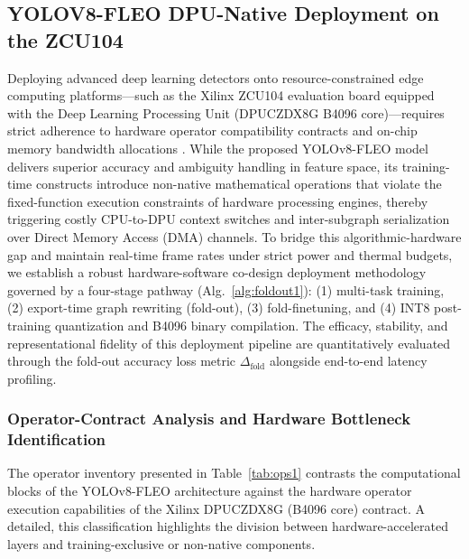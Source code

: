 \documentclass[algorithms,article,submit,moreauthors]{Definitions/mdpi}
\begin{document}
\subsection{YOLOV8-FLEO DPU-Native Deployment on the ZCU104}
\label{sec:hard}
Deploying advanced deep learning detectors onto resource-constrained edge computing platforms---such as the Xilinx ZCU104 evaluation board equipped with the Deep Learning Processing Unit (DPUCZDX8G B4096 core)---requires strict adherence to hardware operator compatibility contracts and on-chip memory bandwidth allocations \citep{bib25}. While the proposed YOLOv8-FLEO model delivers superior accuracy and ambiguity handling in feature space, its training-time constructs introduce non-native mathematical operations that violate the fixed-function execution constraints of hardware processing engines, thereby triggering costly CPU-to-DPU context switches and inter-subgraph serialization over Direct Memory Access (DMA) channels. To bridge this algorithmic-hardware gap and maintain real-time frame rates under strict power and thermal budgets, we establish a robust hardware-software co-design deployment methodology governed by a four-stage pathway (Alg.~\ref{alg:foldout1}): (1) multi-task training, (2) export-time graph rewriting (fold-out), (3) fold-finetuning, and (4) INT8 post-training quantization and B4096 binary compilation. The efficacy, stability, and representational fidelity of this deployment pipeline are quantitatively evaluated through the fold-out accuracy loss metric $\Delta_{\mathrm{fold}}$ alongside end-to-end latency profiling.

\subsubsection{Operator-Contract Analysis and Hardware Bottleneck Identification}\label{sec:compat}

The operator inventory presented in Table~\ref{tab:ops1} contrasts the computational blocks of the YOLOv8-FLEO architecture against the hardware operator execution capabilities of the Xilinx DPUCZDX8G (B4096 core) contract. A detailed, this classification highlights the division between hardware-accelerated layers and training-exclusive or non-native components.
\end{document}
